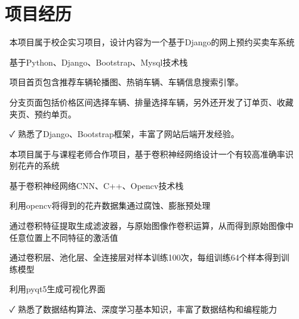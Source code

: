 \documentclass[14pt]{resume}
\begin{document}
\section{\faUsers\ 项目经历}

\begin{onehalfspacing}
\begin{itemize}
    \item[\faFlagO] 本项目属于校企实习项目，设计内容为一个基于Django的网上预约买卖车系统
    \item[\faFlagO] 基于Python、Django、Bootstrap、Mysql技术栈
    \item[\faCode] 项目首页包含推荐车辆轮播图、热销车辆、车辆信息搜索引擎。
    \item[\faCode] 分支页面包括价格区间选择车辆、排量选择车辆，另外还开发了订单页、收藏夹页、预约单页。
    \item[\faCheck] 熟悉了Django、Bootstrap框架，丰富了网站后端开发经验。
\end{itemize}
\end{onehalfspacing}

\begin{onehalfspacing}
\begin{itemize}
    \item[\faFlagO] 本项目属于与课程老师合作项目，基于卷积神经网络设计一个有较高准确率识别花卉的系统
    \item[\faFlagO] 基于卷积神经网络CNN、C++、Opencv技术栈
    \item[\faCode] 利用opencv将得到的花卉数据集通过腐蚀、膨胀预处理
     \item[\faCode] 通过卷积特征提取生成滤波器，与原始图像作卷积运算，从而得到原始图像中任意位置上不同特征的激活值
      \item[\faCode] 通过卷积层、池化层、全连接层对样本训练100次，每组训练64个样本得到训练模型
       \item[\faCode] 利用pyqt5生成可视化界面
    \item[\faCheck] 熟悉了数据结构算法、深度学习基本知识，丰富了数据结构和编程能力
\end{itemize}
\end{onehalfspacing}
\end{document}
